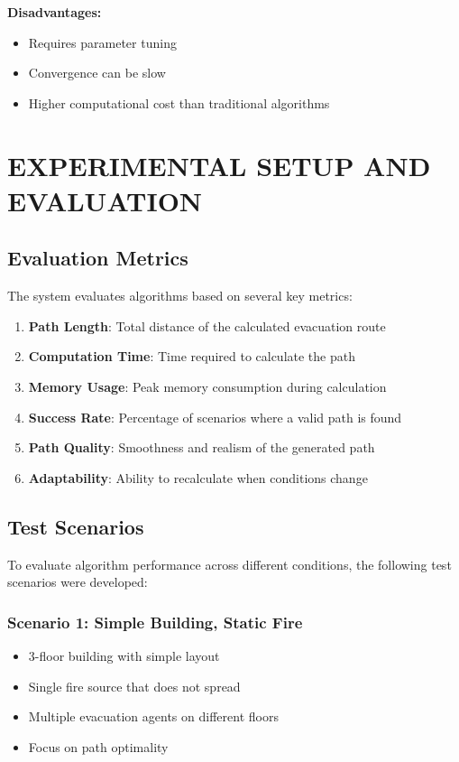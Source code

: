 \documentclass[11pt,a4paper]{report}
\begin{document}
\textbf{Disadvantages:}
\begin{itemize}
    \item Requires parameter tuning
    \item Convergence can be slow
    \item Higher computational cost than traditional algorithms
\end{itemize}

\chapter{EXPERIMENTAL SETUP AND EVALUATION}

\section{Evaluation Metrics}
The system evaluates algorithms based on several key metrics:

\begin{enumerate}
    \item \textbf{Path Length}: Total distance of the calculated evacuation route
    \item \textbf{Computation Time}: Time required to calculate the path
    \item \textbf{Memory Usage}: Peak memory consumption during calculation
    \item \textbf{Success Rate}: Percentage of scenarios where a valid path is found
    \item \textbf{Path Quality}: Smoothness and realism of the generated path
    \item \textbf{Adaptability}: Ability to recalculate when conditions change
\end{enumerate}

\section{Test Scenarios}
To evaluate algorithm performance across different conditions, the following test scenarios were developed:

\subsection{Scenario 1: Simple Building, Static Fire}
\begin{itemize}
    \item 3-floor building with simple layout
    \item Single fire source that does not spread
    \item Multiple evacuation agents on different floors
    \item Focus on path optimality
\end{itemize}
\end{document}
